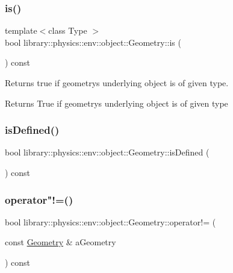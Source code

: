 \subsubsection{\texorpdfstring{is()}{is()}}
{\footnotesize\ttfamily template$<$class Type $>$ \\
bool library\+::physics\+::env\+::object\+::\+Geometry\+::is (\begin{DoxyParamCaption}{ }\end{DoxyParamCaption}) const\hspace{0.3cm}{\ttfamily [inline]}}



Returns true if geometry\textquotesingle{}s underlying object is of given type. 

\begin{DoxyReturn}{Returns}
True if geometry\textquotesingle{}s underlying object is of given type 
\end{DoxyReturn}
\mbox{\label{classlibrary_1_1physics_1_1env_1_1object_1_1_geometry_a1db567a9a36c4b6878e2d59a633f5a38}} 
\subsubsection{\texorpdfstring{is\+Defined()}{isDefined()}}
{\footnotesize\ttfamily bool library\+::physics\+::env\+::object\+::\+Geometry\+::is\+Defined (\begin{DoxyParamCaption}{ }\end{DoxyParamCaption}) const}

\mbox{\label{classlibrary_1_1physics_1_1env_1_1object_1_1_geometry_aab7132adf31bf6bd03dcdad46b767765}} 
\subsubsection{\texorpdfstring{operator"!=()}{operator!=()}}
{\footnotesize\ttfamily bool library\+::physics\+::env\+::object\+::\+Geometry\+::operator!= (\begin{DoxyParamCaption}\item[{const \hyperlink{classlibrary_1_1physics_1_1env_1_1object_1_1_geometry}{Geometry} \&}]{a\+Geometry }\end{DoxyParamCaption}) const}

